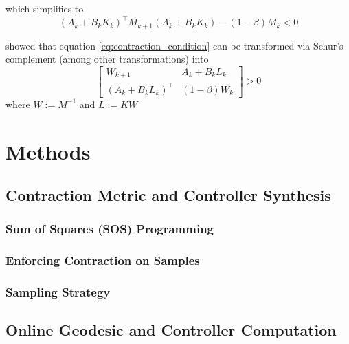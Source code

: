 \documentclass[conference]{IEEEtran}
\begin{document}
which simplifies to
\begin{equation}
	\label{eq:contraction_condition}
	(A_k + B_k K_k)^\top M_{k+1} (A_k + B_k K_k) - (1 - \beta) M_k < 0
\end{equation}

\autocite{weiControlContractionMetric2021} showed that equation \ref{eq:contraction_condition} can be transformed via Schur's complement (among other transformations) into
\begin{equation}
	\label{eq:contraction_condition_schur}
	\begin{bmatrix}
		W_{k+1} & A_k + B_k L_k \\
		(A_k + B_k L_k)^\top & (1 - \beta) W_k
	\end{bmatrix} > 0
\end{equation}
where $W := M^{-1}$ and $L := KW$

\section{Methods}
\subsection{Contraction Metric and Controller Synthesis}
\subsubsection{Sum of Squares (SOS) Programming}
\subsubsection{Enforcing Contraction on Samples}
\subsubsection{Sampling Strategy}

\subsection{Online Geodesic and Controller Computation}

\printbibliography
\end{document}
